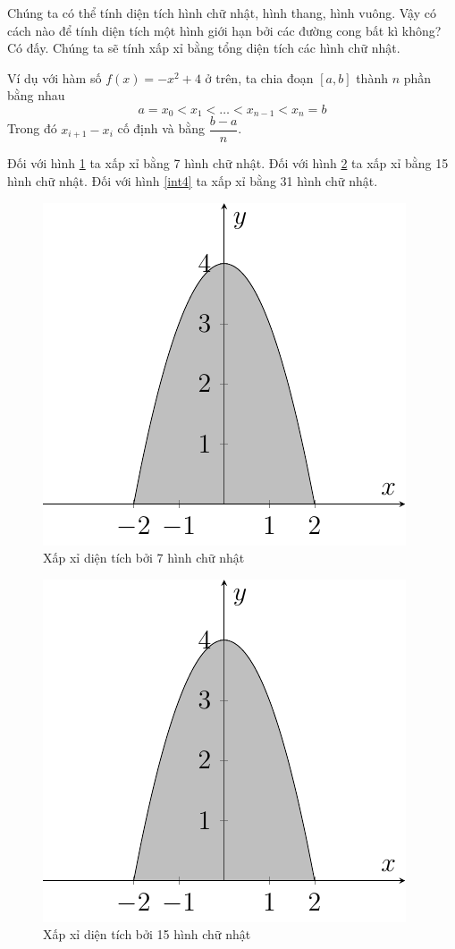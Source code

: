 Chúng ta có thể tính diện tích hình chữ nhật, hình thang, hình vuông. Vậy có cách nào để tính diện tích một hình giới hạn bởi các đường cong bất kì không? Có đấy. Chúng ta sẽ tính xấp xỉ bằng tổng diện tích các hình chữ nhật.

Ví dụ với hàm số $f(x) = -x^2 + 4$ ở trên, ta chia đoạn $[a, b]$ thành $n$ phần bằng nhau \[a = x_0 < x_1 < \ldots < x_{n-1} < x_n = b\]
Trong đó $x_{i+1} - x_i$ cố định và bằng $\dfrac{b-a}{n}$.

Đối với hình \ref{int2} ta xấp xỉ bằng 7 hình chữ nhật. Đối với hình \ref{int3} ta xấp xỉ bằng 15 hình chữ nhật. Đối với hình \ref{int4} ta xấp xỉ bằng 31 hình chữ nhật. 

\begin{figure}[htb]
	\centering
	\includegraphics[page=2]{analytic_geometry/int1.pdf}
	\caption{Xấp xỉ diện tích bởi 7 hình chữ nhật}
	\label{int2}
\end{figure}

\begin{figure}[htb]
	\centering
	\includegraphics[page=3]{analytic_geometry/int1.pdf}
	\caption{Xấp xỉ diện tích bởi 15 hình chữ nhật}
	\label{int3}
\end{figure}

